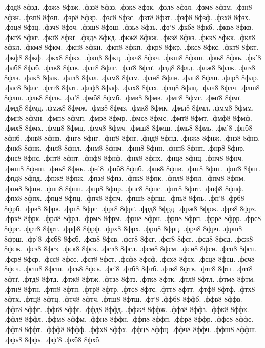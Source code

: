{.фзд8
8фзд.
.фзж8
8фзж.
.фзз8
8фзз.
.фзк8
8фзк.
.фзл8
8фзл.
.фзм8
8фзм.
.фзн8
8фзн.
.фзп8
8фзп.
.фзр8
8фзр.
.фзс8
8фзс.
.фзт8
8фзт.
.фзф8
8фзф.
.фзх8
8фзх.
.фзц8
8фзц.
.фзч8
8фзч.
.фзш8
8фзш.
.фзь8
8фзь.
.фз'8
.фкб8
8фкб.
.фкв8
8фкв.
.фкг8
8фкг.
.фкґ8
8фкґ.
.фкд8
8фкд.
.фкж8
8фкж.
.фкз8
8фкз.
.фкк8
8фкк.
.фкл8
8фкл.
.фкм8
8фкм.
.фкн8
8фкн.
.фкп8
8фкп.
.фкр8
8фкр.
.фкс8
8фкс.
.фкт8
8фкт.
.фкф8
8фкф.
.фкх8
8фкх.
.фкц8
8фкц.
.фкч8
8фкч.
.фкш8
8фкш.
.фкь8
8фкь.
.фк'8
.флб8
8флб.
.флв8
8флв.
.флг8
8флг.
.флґ8
8флґ.
.флд8
8флд.
.флж8
8флж.
.флз8
8флз.
.флк8
8флк.
.флл8
8флл.
.флм8
8флм.
.флн8
8флн.
.флп8
8флп.
.флр8
8флр.
.флс8
8флс.
.флт8
8флт.
.флф8
8флф.
.флх8
8флх.
.флц8
8флц.
.флч8
8флч.
.флш8
8флш.
.фль8
8фль.
.фл'8
.фмб8
8фмб.
.фмв8
8фмв.
.фмг8
8фмг.
.фмґ8
8фмґ.
.фмд8
8фмд.
.фмж8
8фмж.
.фмз8
8фмз.
.фмк8
8фмк.
.фмл8
8фмл.
.фмм8
8фмм.
.фмн8
8фмн.
.фмп8
8фмп.
.фмр8
8фмр.
.фмс8
8фмс.
.фмт8
8фмт.
.фмф8
8фмф.
.фмх8
8фмх.
.фмц8
8фмц.
.фмч8
8фмч.
.фмш8
8фмш.
.фмь8
8фмь.
.фм'8
.фнб8
8фнб.
.фнв8
8фнв.
.фнг8
8фнг.
.фнґ8
8фнґ.
.фнд8
8фнд.
.фнж8
8фнж.
.фнз8
8фнз.
.фнк8
8фнк.
.фнл8
8фнл.
.фнм8
8фнм.
.фнн8
8фнн.
.фнп8
8фнп.
.фнр8
8фнр.
.фнс8
8фнс.
.фнт8
8фнт.
.фнф8
8фнф.
.фнх8
8фнх.
.фнц8
8фнц.
.фнч8
8фнч.
.фнш8
8фнш.
.фнь8
8фнь.
.фн'8
.фпб8
8фпб.
.фпв8
8фпв.
.фпг8
8фпг.
.фпґ8
8фпґ.
.фпд8
8фпд.
.фпж8
8фпж.
.фпз8
8фпз.
.фпк8
8фпк.
.фпл8
8фпл.
.фпм8
8фпм.
.фпн8
8фпн.
.фпп8
8фпп.
.фпр8
8фпр.
.фпс8
8фпс.
.фпт8
8фпт.
.фпф8
8фпф.
.фпх8
8фпх.
.фпц8
8фпц.
.фпч8
8фпч.
.фпш8
8фпш.
.фпь8
8фпь.
.фп'8
.фрб8
8фрб.
.фрв8
8фрв.
.фрг8
8фрг.
.фрґ8
8фрґ.
.фрд8
8фрд.
.фрж8
8фрж.
.фрз8
8фрз.
.фрк8
8фрк.
.фрл8
8фрл.
.фрм8
8фрм.
.фрн8
8фрн.
.фрп8
8фрп.
.фрр8
8фрр.
.фрс8
8фрс.
.фрт8
8фрт.
.фрф8
8фрф.
.фрх8
8фрх.
.фрц8
8фрц.
.фрч8
8фрч.
.фрш8
8фрш.
.фр'8
.фсб8
8фсб.
.фсв8
8фсв.
.фсг8
8фсг.
.фсґ8
8фсґ.
.фсд8
8фсд.
.фсж8
8фсж.
.фсз8
8фсз.
.фск8
8фск.
.фсл8
8фсл.
.фсм8
8фсм.
.фсн8
8фсн.
.фсп8
8фсп.
.фср8
8фср.
.фсс8
8фсс.
.фст8
8фст.
.фсф8
8фсф.
.фсх8
8фсх.
.фсц8
8фсц.
.фсч8
8фсч.
.фсш8
8фсш.
.фсь8
8фсь.
.фс'8
.фтб8
8фтб.
.фтв8
8фтв.
.фтг8
8фтг.
.фтґ8
8фтґ.
.фтд8
8фтд.
.фтж8
8фтж.
.фтз8
8фтз.
.фтк8
8фтк.
.фтл8
8фтл.
.фтм8
8фтм.
.фтн8
8фтн.
.фтп8
8фтп.
.фтр8
8фтр.
.фтс8
8фтс.
.фтт8
8фтт.
.фтф8
8фтф.
.фтх8
8фтх.
.фтц8
8фтц.
.фтч8
8фтч.
.фтш8
8фтш.
.фт'8
.ффб8
8ффб.
.ффв8
8ффв.
.ффг8
8ффг.
.ффґ8
8ффґ.
.ффд8
8ффд.
.ффж8
8ффж.
.ффз8
8ффз.
.ффк8
8ффк.
.ффл8
8ффл.
.ффм8
8ффм.
.ффн8
8ффн.
.ффп8
8ффп.
.ффр8
8ффр.
.ффс8
8ффс.
.ффт8
8ффт.
.ффф8
8ффф.
.ффх8
8ффх.
.ффц8
8ффц.
.ффч8
8ффч.
.ффш8
8ффш.
.ффь8
8ффь.
.фф'8
.фхб8
8фхб.
}
